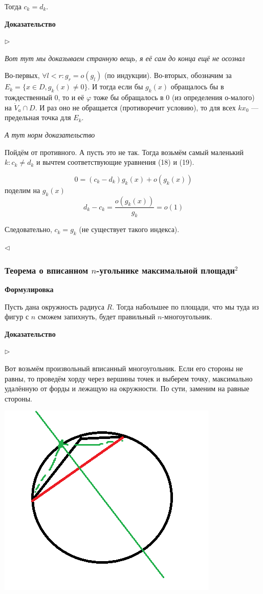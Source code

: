 \documentclass{article}
\begin{document}
Тогда $c_k = d_k$.

\textbf{Доказательство}

$\rhd$

\textit{Вот тут мы доказываем странную вещь, я её сам до конца ещё не осознал}


Во-первых, $\forall l < r : g_r = o(g_l)$ (по индукции).
Во-вторых, обозначим за $E_k = \{x \in D, g_k(x) \neq 0\}$. И тогда если бы $g_k(x)$ обращалось бы в тождественный 0, то и её $\varphi$ тоже бы обращалось в 0 (из определения о-малого) на $\dot{V}_a \cap D$. И раз оно не обращается (противоречит условию), то для всех $k x_0$ --- предельная точка для $E_k$.

\textit{А тут норм доказательство}

Пойдём от противного. А пусть это не так. Тогда возьмём самый маленький $k: c_k \neq d_k$ и вычтем соответствующие уравнения (18) и (19).

\[0 = (c_k - d_k)g_k(x) + o(g_k(x))\] поделим на $g_k(x)$
\[d_k - c_k = \frac{o(g_k(x))}{g_k} = o(1)\]

Следовательно, $c_k = g_k$ (не существует такого индекса).

$\lhd$

\subsubsection{Теорема о вписанном \texorpdfstring{$n$}{n}-угольнике максимальной площади\texorpdfstring{$^2$}{}}

\textbf{Формулировка}

Пусть дана окружность радиуса $R$. Тогда набольшее по площади, что мы туда из фигур с $n$ сможем запихнуть, будет правильный $n$-многоугольник.

\textbf{Доказательство}

$\rhd$

Вот возьмём произвольный вписанный многоугольник. Если его стороны не равны, то проведём хорду через вершины точек и выберем точку, максимально удалённую от форды и лежащую на окружности. По сути, заменим на равные стороны. 

\begin{center}
    \includegraphics[scale=0.5]{../images/npolygon.png}
\end{center}
\end{document}
